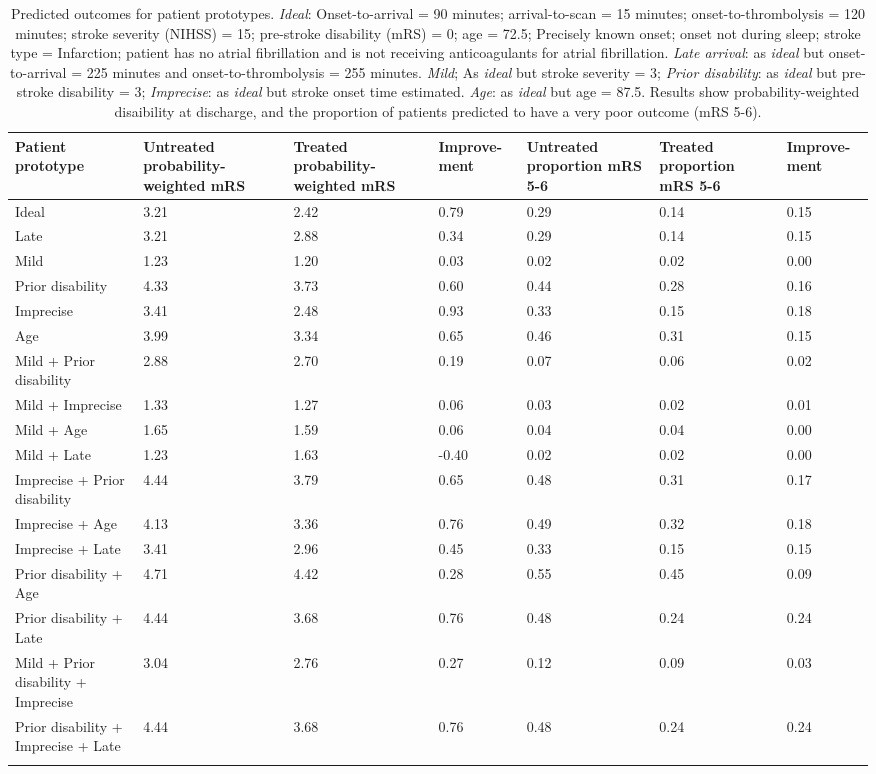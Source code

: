 \begin{minipage}{1\textwidth}
\small
\begin{longtable}{p{5.2cm} | p{1.6cm} p{1.6cm} p{1.5cm} | p{1.6cm} p{1.6cm} p{1.5cm}}
\caption{Predicted outcomes for patient prototypes. \textit{Ideal}: Onset-to-arrival = 90 minutes; arrival-to-scan = 15 minutes; onset-to-thrombolysis = 120 minutes; stroke severity (NIHSS) = 15; pre-stroke disability (mRS) = 0; age = 72.5; Precisely known onset; onset not during sleep; stroke type = Infarction; patient has no atrial fibrillation and is not receiving anticoagulants for atrial fibrillation. \textit{Late arrival}: as \textit{ideal} but onset-to-arrival = 225 minutes and onset-to-thrombolysis = 255 minutes. \textit{Mild}; As \textit{ideal} but stroke severity = 3; \textit{Prior disability}: as \textit{ideal} but pre-stroke disability = 3; \textit{Imprecise}: as \textit{ideal} but stroke onset time estimated. \textit{Age}: as \textit{ideal} but age = 87.5. Results show probability-weighted disaibility at discharge, and the proportion of patients predicted to have a very poor outcome (mRS 5-6).}\\
\toprule
\endhead
Patient prototype & Untreated probability-weighted mRS & Treated probability-weighted mRS & Improve-ment & Untreated proportion mRS 5-6 & Treated proportion mRS 5-6 & Improve-ment\tabularnewline
\midrule
Ideal & 3.21 & 2.42 & 0.79 & 0.29 & 0.14 & 0.15\tabularnewline
Late & 3.21 & 2.88 & 0.34 & 0.29 & 0.14 & 0.15\tabularnewline
Mild & 1.23 & 1.20 & 0.03 & 0.02 & 0.02 & 0.00\tabularnewline
Prior disability & 4.33 & 3.73 & 0.60 & 0.44 & 0.28 & 0.16\tabularnewline
Imprecise & 3.41 & 2.48 & 0.93 & 0.33 & 0.15 & 0.18\tabularnewline
Age & 3.99 & 3.34 & 0.65 & 0.46 & 0.31 & 0.15\tabularnewline
Mild + Prior disability & 2.88 & 2.70 & 0.19 & 0.07 & 0.06 & 0.02\tabularnewline
Mild + Imprecise & 1.33 & 1.27 & 0.06 & 0.03 & 0.02 & 0.01\tabularnewline
Mild + Age & 1.65 & 1.59 & 0.06 & 0.04 & 0.04 & 0.00\tabularnewline
Mild + Late & 1.23 & 1.63 & -0.40 & 0.02 & 0.02 & 0.00\tabularnewline
Imprecise + Prior disability & 4.44 & 3.79 & 0.65 & 0.48 & 0.31 & 0.17\tabularnewline
Imprecise + Age & 4.13 & 3.36 & 0.76 & 0.49 & 0.32 & 0.18\tabularnewline
Imprecise + Late & 3.41 & 2.96 & 0.45 & 0.33 & 0.15 & 0.15\tabularnewline
Prior disability + Age & 4.71 & 4.42 & 0.28 & 0.55 & 0.45 & 0.09\tabularnewline
Prior disability + Late & 4.44 & 3.68 & 0.76 & 0.48 & 0.24 & 0.24\tabularnewline
Mild + Prior disability + Imprecise & 3.04 & 2.76 & 0.27 & 0.12 & 0.09 & 0.03\tabularnewline
Prior disability + Imprecise + Late & 4.44 & 3.68 & 0.76 & 0.48 & 0.24 & 0.24\tabularnewline
\bottomrule
\label{tab:prototype_outcomes}
\end{longtable}
\normalsize
\end{minipage}



